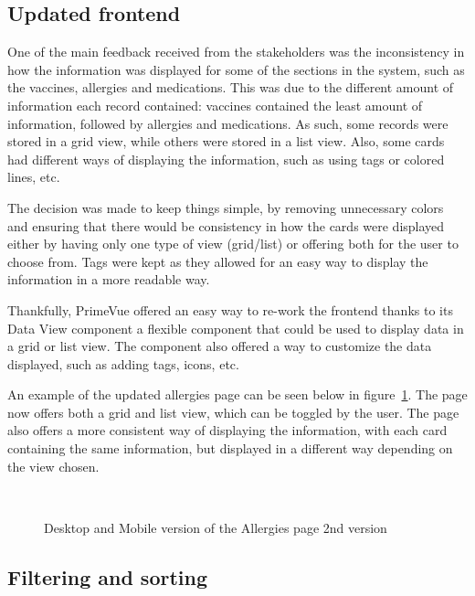 \subsection{Updated frontend}

One of the main feedback received from the stakeholders was the inconsistency in how the information was displayed for some of the sections in the system, such as the vaccines, allergies and medications. This was due to the different amount of information each record contained: vaccines contained the least amount of information, followed by allergies and medications. As such, some records were stored in a grid view, while others were stored in a list view. Also, some cards had different ways of displaying the information, such as using tags or colored lines, etc. 

The decision was made to keep things simple, by removing unnecessary colors and ensuring that there would be consistency in how the cards were displayed \- either by having only one type of view (grid/list) or offering both for the user to choose from. Tags were kept as they allowed for an easy way to display the information in a more readable way.

Thankfully, PrimeVue offered an easy way to re-work the frontend thanks to its Data View component \- a flexible component that could be used to display data in a grid or list view. The component also offered a way to customize the data displayed, such as adding tags, icons, etc. 

An example of the updated allergies page can be seen below in figure~\ref{fig:allergiespagev2}. The page now offers both a grid and list view, which can be toggled by the user. The page also offers a more consistent way of displaying the information, with each card containing the same information, but displayed in a different way depending on the view chosen.

\begin{figure}[ht]
  \centering
  \\[\baselineskip]
  \caption{Desktop and Mobile version of the Allergies page \- 2nd version}\label{fig:allergiespagev2}
\end{figure}

\FloatBarrier{}

\subsection{Filtering and sorting}

